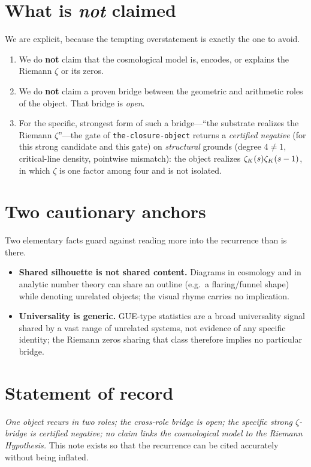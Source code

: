 \documentclass[11pt]{article}
\begin{document}
\section{What is \emph{not} claimed}
We are explicit, because the tempting overstatement is exactly the one to avoid.
\begin{enumerate}
  \item We do \textbf{not} claim that the cosmological model is, encodes, or
  explains the Riemann $\zeta$ or its zeros.
  \item We do \textbf{not} claim a proven bridge between the geometric and arithmetic
  roles of the object. That bridge is \emph{open}.
  \item For the specific, strongest form of such a bridge---``the substrate realizes
  the Riemann $\zeta$''---the gate of \texttt{the-closure-object} returns a
  \emph{certified negative} (for this strong candidate and this gate) on
  \emph{structural} grounds (degree $4\ne1$, critical-line density, pointwise mismatch):
  the object realizes $\zeta_{K}(s)\zeta_{K}(s-1)$, in which
  $\zeta$ is one factor among four and is not isolated.
\end{enumerate}

\section{Two cautionary anchors}
Two elementary facts guard against reading more into the recurrence than is there.
\begin{itemize}
  \item \textbf{Shared silhouette is not shared content.} Diagrams in cosmology and
  in analytic number theory can share an outline (e.g.\ a flaring/funnel shape)
  while denoting unrelated objects; the visual rhyme carries no implication.
  \item \textbf{Universality is generic.} GUE-type statistics are a broad universality
  signal shared by a vast range of unrelated systems, not evidence of any specific
  identity; the Riemann zeros sharing that class therefore implies no particular bridge.
\end{itemize}

\section{Statement of record}
\emph{One object recurs in two roles; the cross-role bridge is open; the specific
\emph{strong} $\zeta$-bridge is certified negative; no claim links the cosmological model to the
Riemann Hypothesis.} This note exists so that the recurrence can be cited accurately
without being inflated.
\end{document}
